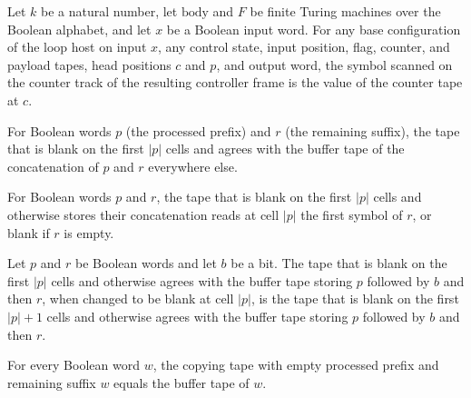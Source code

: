 \begin{lemma}
\label{Turing.FinTM.loopFrame_counter}
\leanok
{}
Let $k$ be a natural number, let $\mathrm{body}$ and $F$ be finite Turing machines over
the Boolean alphabet, and let $x$ be a Boolean input word. For any base configuration of
the loop host on input $x$, any control state, input position, flag, counter, and
payload tapes, head positions $c$ and $p$, and output word, the symbol scanned on the
counter track of the resulting controller frame is the value of the counter tape at $c$.
\end{lemma}

\begin{definition}
\label{Turing.FinTM.loopCopyTape}
\leanok
{}
For Boolean words $p$ (the processed prefix) and $r$ (the remaining suffix), the tape
that is blank on the first $|p|$ cells and agrees with the buffer tape of the
concatenation of $p$ and $r$ everywhere else.
\end{definition}

\begin{lemma}
\label{Turing.FinTM.loopCopy_read}
\leanok
{}
For Boolean words $p$ and $r$, the tape that is blank on the first $|p|$ cells and
otherwise stores their concatenation reads at cell $|p|$ the first symbol of $r$, or
blank if $r$ is empty.
\end{lemma}

\begin{lemma}
\label{Turing.FinTM.loopCopy_erase}
\leanok
{}
Let $p$ and $r$ be Boolean words and let $b$ be a bit. The tape that is blank on the
first $|p|$ cells and otherwise agrees with the buffer tape storing $p$ followed by $b$
and then $r$, when changed to be blank at cell $|p|$, is the tape that is blank on the
first $|p|+1$ cells and otherwise agrees with the buffer tape storing $p$ followed by
$b$ and then $r$.
\end{lemma}

\begin{lemma}
\label{Turing.FinTM.loopCopy_initial}
\leanok
{}
For every Boolean word $w$, the copying tape with empty processed prefix and remaining
suffix $w$ equals the buffer tape of $w$.
\end{lemma}

